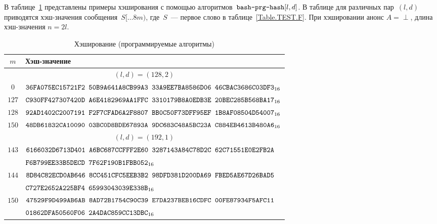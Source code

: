 \label{TEST.PrgHash}

В таблице~\ref{Table.TEST.PrgHash} представлены примеры хэширования
с помощью алгоритмов~$\texttt{bash-prg-hash}[l,d]$.
%
В таблице для различных пар~$(l,d)$ приводятся хэш-значения 
сообщения~$S[\dots 8m)$, где~$S$~--- первое слово в таблице~\ref{Table.TEST.F}.
%
При хэшировании анонс $A=\perp$, длина хэш-значения $n=2l$.

\begin{table}[H]
\caption{Хэширование (программируемые алгоритмы)}\label{Table.TEST.PrgHash}
\begin{tabular}{|c|l|}
\hline
$m$ & Хэш-значение\\
\hline
%
\hline
\multicolumn{2}{|c|}{$(l,d)=(128,2)$}\\
\hline
$0$ &
$\texttt{36FA075EC15721F2~50B9A641A8CB99A3~33A9EE7BA8586D06~46CBAC3686C03DF3}_{16}$\\
\hline
$127$ &
$\texttt{C930FF427307420D~A6E4182969AA1FFC~3310179B8A0EDB3E~20BEC285B568BA17}_{16}$\\
\hline                                                        
$128$ &
$\texttt{92AD1402C2007191~F2F7CFAD6A2F8807~BB0C50F73DFF95EF~1B8AF08504D54007}_{16}$\\
\hline                                                        
$150$ &
$\texttt{48DB61832CA10090~03BC0D8BDE67893A~9DC683C48A5BC23A~C884EB4613B480A6}_{16}$\\
%
\hline
\hline
\multicolumn{2}{|c|}{$(l,d)=(192,1)$}\\
\hline
$143$ &
$\texttt{6166032D6713D401~A6BC687CCFFF2E60~3287143A84C78D2C~62C71551E0E2FB2A}$\\
&
 $\texttt{F6B799EE33B5DECD~7F62F190B1FBB052}_{16}$\\
\hline
$144$ &
$\texttt{8D84C82ECD0AB646~8CC451CFC5EEB3B2~98DFD381D200DA69~FBED5AE67D26BAD5}$\\
&
 $\texttt{C727E2652A225BF4~65993043039E338B}_{16}$\\
\hline                                                        
$150$ &
$\texttt{47529F9D499AB6AB~8AD72B1754C90C39~E7DA237BEB16CDFC~00FE87934F5AFC11}$\\
&
 $\texttt{01862DFA50560F06~2A4DAC859CC13DBC}_{16}$\\
\hline
\end{tabular}
\end{table}

